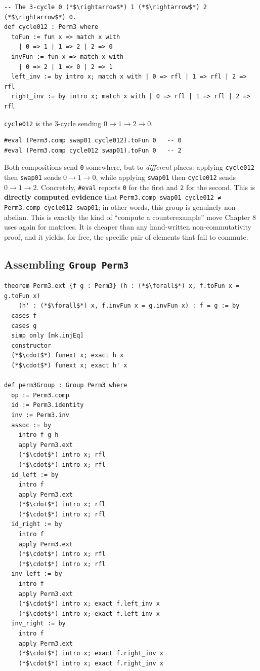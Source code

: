 \begin{lstlisting}
-- The 3-cycle 0 (*$\rightarrow$*) 1 (*$\rightarrow$*) 2 (*$\rightarrow$*) 0.
def cycle012 : Perm3 where
  toFun := fun x => match x with
    | 0 => 1 | 1 => 2 | 2 => 0
  invFun := fun x => match x with
    | 0 => 2 | 1 => 0 | 2 => 1
  left_inv := by intro x; match x with | 0 => rfl | 1 => rfl | 2 => rfl
  right_inv := by intro x; match x with | 0 => rfl | 1 => rfl | 2 => rfl
\end{lstlisting}

\texttt{cycle012} is the 3-cycle sending \(0 \to 1 \to 2 \to 0\).

\begin{lstlisting}
#eval (Perm3.comp swap01 cycle012).toFun 0   -- 0
#eval (Perm3.comp cycle012 swap01).toFun 0   -- 2
\end{lstlisting}

Both compositions send \texttt{0} somewhere, but to \emph{different} places: applying \texttt{cycle012} then \texttt{swap01} sends \(0 \to 1 \to 0\), while applying \texttt{swap01} then \texttt{cycle012} sends \(0 \to 1 \to 2\). Concretely, \texttt{\#eval} reports \texttt{0} for the first and \texttt{2} for the second. This is \textbf{directly computed evidence} that \texttt{Perm3.comp swap01 cycle012 ≠ Perm3.comp cycle012 swap01}; in other words, this group is genuinely non-abelian. This is exactly the kind of ``compute a counterexample'' move Chapter 8 uses again for matrices. It is cheaper than any hand-written non-commutativity proof, and it yields, for free, the specific pair of elements that fail to commute.

\subsection{\texorpdfstring{Assembling \texttt{Group\ Perm3}}{Assembling Group Perm3}}\label{sec:06-groups:04-permutations-example:5}

\begin{lstlisting}
theorem Perm3.ext {f g : Perm3} (h : (*$\forall$*) x, f.toFun x = g.toFun x)
    (h' : (*$\forall$*) x, f.invFun x = g.invFun x) : f = g := by
  cases f
  cases g
  simp only [mk.injEq]
  constructor
  (*$\cdot$*) funext x; exact h x
  (*$\cdot$*) funext x; exact h' x

def perm3Group : Group Perm3 where
  op := Perm3.comp
  id := Perm3.identity
  inv := Perm3.inv
  assoc := by
    intro f g h
    apply Perm3.ext
    (*$\cdot$*) intro x; rfl
    (*$\cdot$*) intro x; rfl
  id_left := by
    intro f
    apply Perm3.ext
    (*$\cdot$*) intro x; rfl
    (*$\cdot$*) intro x; rfl
  id_right := by
    intro f
    apply Perm3.ext
    (*$\cdot$*) intro x; rfl
    (*$\cdot$*) intro x; rfl
  inv_left := by
    intro f
    apply Perm3.ext
    (*$\cdot$*) intro x; exact f.left_inv x
    (*$\cdot$*) intro x; exact f.left_inv x
  inv_right := by
    intro f
    apply Perm3.ext
    (*$\cdot$*) intro x; exact f.right_inv x
    (*$\cdot$*) intro x; exact f.right_inv x
\end{lstlisting}

